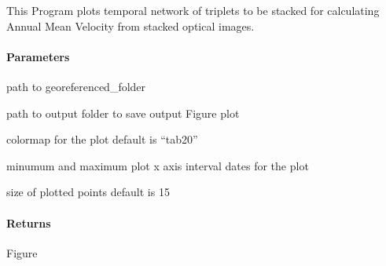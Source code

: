 \documentclass[letterpaper,10pt,english]{sphinxmanual}
\begin{document}
\begin{fulllineitems}
\label{\detokenize{akhdefo_functions:akhdefo_functions.AkhdefoPlot.plot_stackNetwork}}
\pysigstartsignatures
{}
\pysigstopsignatures
\sphinxAtStartPar
This Program plots temporal network of triplets to be stacked for calculating 
Annual Mean Velocity from stacked optical images.


\paragraph{Parameters}
\label{\detokenize{akhdefo_functions:id3}}\begin{description}
\sphinxAtStartPar
path to georeferenced\_folder

\sphinxAtStartPar
path to output folder to save output Figure plot

\sphinxAtStartPar
colormap for the plot default is “tab20”

\sphinxAtStartPar
minumum and maximum plot x axis interval dates for the plot

\sphinxAtStartPar
size of plotted points default is 15

\end{description}


\paragraph{Returns}
\label{\detokenize{akhdefo_functions:id4}}
\sphinxAtStartPar
Figure

\end{fulllineitems}
\end{document}
